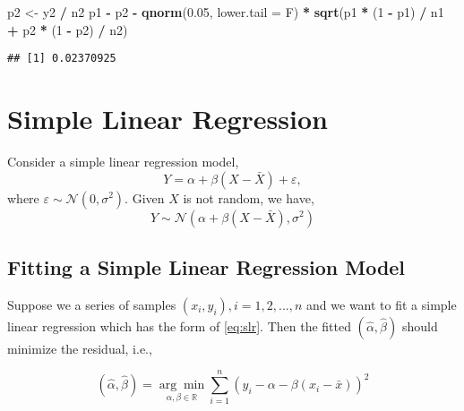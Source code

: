 \documentclass[
]{book}
\newenvironment{Shaded}{\begin{snugshade}}{\end{snugshade}}
\newcommand{\DataTypeTok}[1]{\textcolor[rgb]{0.13,0.29,0.53}{#1}}
\newcommand{\DecValTok}[1]{\textcolor[rgb]{0.00,0.00,0.81}{#1}}
\newcommand{\FloatTok}[1]{\textcolor[rgb]{0.00,0.00,0.81}{#1}}
\newcommand{\KeywordTok}[1]{\textcolor[rgb]{0.13,0.29,0.53}{\textbf{#1}}}
\newcommand{\NormalTok}[1]{#1}
\newcommand{\OperatorTok}[1]{\textcolor[rgb]{0.81,0.36,0.00}{\textbf{#1}}}
\newcommand{\StringTok}[1]{\textcolor[rgb]{0.31,0.60,0.02}{#1}}
\theoremstyle{definition}
\theoremstyle{definition}
\theoremstyle{definition}
\theoremstyle{remark}
\begin{document}
\begin{Shaded}
\begin{Highlighting}[]
\NormalTok{p2 <-}\StringTok{ }\NormalTok{y2 }\OperatorTok{/}\StringTok{ }\NormalTok{n2}
\NormalTok{p1 }\OperatorTok{-}\StringTok{ }\NormalTok{p2 }\OperatorTok{-}\StringTok{ }\KeywordTok{qnorm}\NormalTok{(}\FloatTok{0.05}\NormalTok{, }\DataTypeTok{lower.tail =}\NormalTok{ F) }\OperatorTok{*}\StringTok{ }\KeywordTok{sqrt}\NormalTok{(p1 }\OperatorTok{*}\StringTok{ }\NormalTok{(}\DecValTok{1} \OperatorTok{-}\StringTok{ }\NormalTok{p1) }\OperatorTok{/}\StringTok{ }\NormalTok{n1 }\OperatorTok{+}\StringTok{ }\NormalTok{p2 }\OperatorTok{*}\StringTok{ }\NormalTok{(}\DecValTok{1} \OperatorTok{-}\StringTok{  }\NormalTok{p2) }\OperatorTok{/}\StringTok{ }\NormalTok{n2)}
\end{Highlighting}
\end{Shaded}

\begin{verbatim}
## [1] 0.02370925
\end{verbatim}

\hypertarget{simple-linear-regression}{%
\chapter{Simple Linear Regression}\label{simple-linear-regression}}

Consider a simple linear regression model,
\begin{equation}
Y = \alpha + \beta(X-\bar X) + \varepsilon,
\label{eq:slr}
\end{equation}
where \(\varepsilon\sim \mathcal{N}(0, \sigma^2)\). Given \(X\) is not random, we have,
\begin{equation}
Y\sim \mathcal{N}(\alpha + \beta(X-\bar X), \sigma^2)
\end{equation}

\hypertarget{fitting-a-simple-linear-regression-model}{%
\section{Fitting a Simple Linear Regression Model}\label{fitting-a-simple-linear-regression-model}}

Suppose we a series of samples \((x_i,y_i), i=1,2,...,n\) and we want to fit a simple linear regression which has the form of \eqref{eq:slr}. Then the fitted \((\hat \alpha,\hat\beta)\) should minimize the residual, i.e.,

\begin{equation}
(\hat \alpha,\hat\beta) = \underset{\alpha,\beta\in \mathbb{R}}{\arg\min}\sum_{i=1}^n(y_i-\alpha-\beta(x_i-\bar x))^2
\label{eq:residual}
\end{equation}
\end{document}
